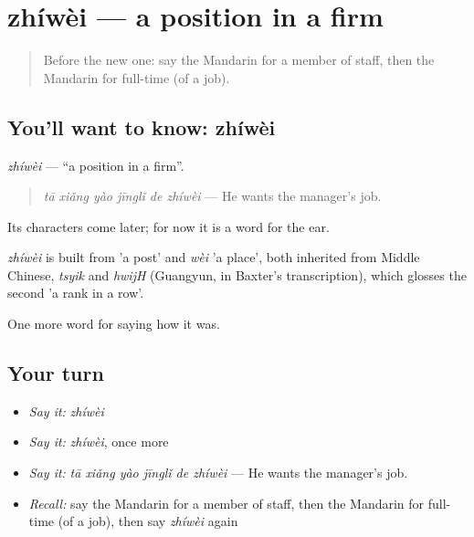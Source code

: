 \section[zhíwèi]{zhíwèi — a position in a firm}

\label{lesson:ZH-C489-zhiwei}



\begin{quote}
Before the new one: say the Mandarin for a member of staff, then the Mandarin for full-time (of a job).
\end{quote}

\subsection*{You'll want to know: zhíwèi}
\emph{zhíwèi} — \textquotedblleft{}a position in a firm\textquotedblright{}.

\begin{quote}
\emph{tā xiǎng yào jīnglǐ de zhíwèi} — He wants the manager's job.
\end{quote}

Its characters come later; for now it is a word for the ear.

\begin{cousinweb}
\emph{zhíwèi} is built from  'a post' and \emph{wèi} 'a place', both inherited from Middle Chinese, \emph{tsyik} and \emph{hwijH} (Guangyun, in Baxter's transcription), which glosses the second 'a rank in a row'.
\end{cousinweb}

\begin{grammarlens}[title={What you've built}]
One more word for saying how it was.
\end{grammarlens}

\subsection*{Your turn}
\begin{itemize}
\raggedright
  \item \emph{Say it:} \emph{zhíwèi}
  \item \emph{Say it:} \emph{zhíwèi}, once more
  \item \emph{Say it:} \emph{tā xiǎng yào jīnglǐ de zhíwèi} — He wants the manager's job.
  \item \emph{Recall:} say the Mandarin for a member of staff, then the Mandarin for full-time (of a job), then say \emph{zhíwèi} again
\end{itemize}

